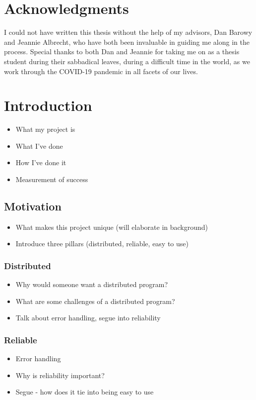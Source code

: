 \documentclass[twoside]{report}
\begin{document}
\chapter*{Acknowledgments}

I could not have written this thesis without the help of my advisors, Dan Barowy and Jeannie Albrecht, who have both been invaluable in guiding me along in the process. Special thanks to both Dan and Jeannie for taking me on as a thesis student during their sabbadical leaves, during a difficult time in the world, as we work through the COVID-19 pandemic in all facets of our lives.



\chapter{Introduction}
\begin{itemize}
  \item What my project is
  \item What I've done
  \item How I've done it
  \item Measurement of success
\end{itemize}

\section{Motivation}
\begin{itemize}
  \item What makes this project unique (will elaborate in background)
  \item Introduce three pillars (distributed, reliable, easy to use)
\end{itemize}

\subsection{Distributed}
\begin{itemize}
  \item Why would someone want a distributed program?
  \item What are some challenges of a distributed program?
  \item Talk about error handling, segue into reliability
\end{itemize}

\subsection{Reliable}
\begin{itemize}
  \item Error handling
  \item Why is reliability important?
  \item Segue - how does it tie into being easy to use
\end{itemize}
\end{document}
